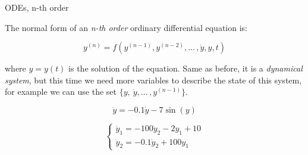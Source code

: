 \documentclass{beamer}
\begin{document}
\begin{frame}{ODEs, n-th order}
\begin{flushleft}

The normal form of an \emph{n-th order} ordinary differential equation is:

\begin{equation}
	y^{(n)} = f (y^{(n-1)}, y^{(n-2)}, ...\,, \dot{y}, y, t)
\end{equation}
			
where $y = y(t)$ is the solution of the equation. Same as before, it is a \emph{dynamical system}, but this time we need more variables to describe the state of this system, for example we can use the set $\{ y, \ \dot{y} , ...\,,y^{(n-1)} \}$.

\begin{example}[Pendulum]
\begin{equation}
    \ddot{y} = - 0.1 \dot y - 7\sin(y)
\end{equation}
\end{example}


\begin{example}
\begin{equation}
\begin{cases}
    \dot{y}_1 = - 100 \dot{y}_2 -2 y_1  + 10 \\
    \ddot{y}_2 = -0.1 \dot{y}_2 + 100 y_1
\end{cases}
\end{equation}
\end{example}

\end{flushleft}
\end{frame}
\end{document}
